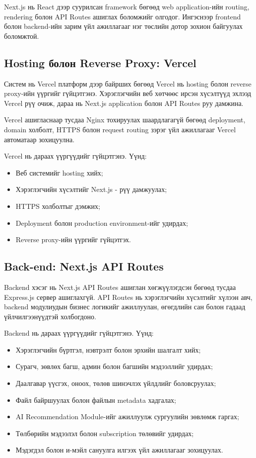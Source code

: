 Next.js нь React дээр суурилсан framework бөгөөд web application-ийн
routing, rendering болон API Routes ашиглах боломжийг олгодог.
Ингэснээр frontend болон backend-ийн зарим үйл ажиллагааг нэг төслийн
дотор зохион байгуулах боломжтой.

\subsection*{Hosting болон Reverse Proxy: Vercel}

Систем нь Vercel платформ дээр байрших бөгөөд Vercel нь hosting болон
reverse proxy-ийн үүргийг гүйцэтгэнэ. Хэрэглэгчийн веб хөтчөөс ирсэн
хүсэлтүүд эхлээд Vercel рүү очиж, дараа нь Next.js application болон
API Routes руу дамжина.

Vercel ашигласнаар тусдаа Nginx тохируулах шаардлагагүй бөгөөд deployment,
domain холболт, HTTPS болон request routing зэрэг үйл ажиллагааг Vercel
автоматаар зохицуулна.

Vercel нь дараах үүргүүдийг гүйцэтгэнэ. Үүнд:

\begin{itemize}
    \item Веб системийг hosting хийх;
    \item Хэрэглэгчийн хүсэлтийг Next.js - рүү дамжуулах;
    \item HTTPS холболтыг дэмжих;
    \item Deployment болон production environment-ийг удирдах;
    \item Reverse proxy-ийн үүргийг гүйцэтгэх.
\end{itemize}

\subsection*{Back-end: Next.js API Routes}

Backend хэсэг нь Next.js API Routes ашиглан хөгжүүлэгдсэн бөгөөд
тусдаа Express.js сервер ашиглахгүй. API Routes нь хэрэглэгчийн
хүсэлтийг хүлээн авч, backend модулиудын бизнес логикийг ажиллуулан,
өгөгдлийн сан болон гадаад үйлчилгээнүүдтэй холбогдоно.

Backend нь дараах үүргүүдийг гүйцэтгэнэ. Үүнд:

\begin{itemize}
    \item Хэрэглэгчийн бүртгэл, нэвтрэлт болон эрхийн шалгалт хийх;
    \item Сурагч, зөвлөх багш, админ болон багшийн мэдээллийг удирдах;
    \item Даалгавар үүсгэх, оноох, төлөв шинэчлэх үйлдлийг боловсруулах;
    \item Файл байршуулах болон файлын metadata хадгалах;
    \item AI Recommendation Module-ийг ажиллуулж сургуулийн зөвлөмж гаргах;
    \item Төлбөрийн мэдээлэл болон subscription төлөвийг удирдах;
    \item Мэдэгдэл болон и-мэйл сануулга илгээх үйл ажиллагааг зохицуулах.
\end{itemize}

